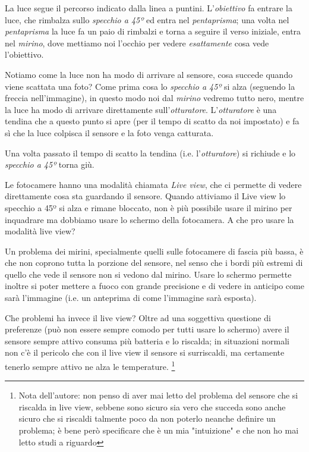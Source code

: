 La luce segue il percorso indicato dalla linea a puntini.\newline
L'\textit{obiettivo} fa entrare la luce, che rimbalza sullo \textit{specchio a 45º} ed entra nel \textit{pentaprisma}; una volta nel \textit{pentaprisma} la luce fa un paio di rimbalzi e torna a seguire il verso iniziale, entra nel \textit{mirino}, dove mettiamo noi l'occhio per vedere \textit{esattamente} cosa vede l'obiettivo.

Notiamo come la luce non ha modo di arrivare al sensore, cosa succede quando viene scattata una foto?\newline
Come prima cosa lo \textit{specchio a 45º} si alza (seguendo la freccia nell'immagine), in questo modo noi dal \textit{mirino} vedremo tutto nero, mentre la luce ha modo di arrivare direttamente sull'\textit{otturatore}.
L'\textit{otturatore} è una tendina che a questo punto si apre (per il tempo di scatto da noi impostato) e fa sì che la luce colpisca il sensore e la foto venga catturata.

Una volta passato il tempo di scatto la tendina (i.e. l'\textit{otturatore}) si richiude e lo \textit{specchio a 45º} torna giù.

Le fotocamere hanno una modalità chiamata \textit{Live view}, che ci permette di vedere direttamente cosa sta guardando il sensore. Quando attiviamo il Live view lo specchio a 45º si alza e rimane bloccato, non è più possibile usare il mirino per inquadrare ma dobbiamo usare lo schermo della fotocamera. A che pro usare la modalità live view?

Un problema dei mirini, specialmente quelli sulle fotocamere di fascia più bassa, è che non coprono tutta la porzione del sensore, nel senso che i bordi più estremi di quello che vede il sensore non si vedono dal mirino.
Usare lo schermo permette inoltre si poter mettere a fuoco con grande precisione e di vedere in anticipo come sarà l'immagine (i.e. un anteprima di come l'immagine sarà esposta).

Che problemi ha invece il live view? Oltre ad una soggettiva questione di preferenze (può non essere sempre comodo per tutti usare lo schermo) avere il sensore sempre attivo consuma più batteria e lo riscalda; in situazioni normali non c'è il pericolo che con il live view il sensore si surriscaldi, ma certamente tenerlo sempre attivo ne alza le temperature.
\footnote{Nota dell'autore: non penso di aver mai letto del problema del sensore che si riscalda in live view, sebbene sono sicuro sia vero che succeda sono anche sicuro che si riscaldi talmente poco da non poterlo neanche definire un problema; è bene però specificare che è un mia "intuizione" e che non ho mai letto studi a riguardo}


